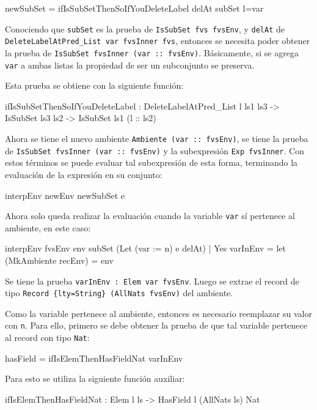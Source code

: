 \begin{code}
newSubSet =
  ifIsSubSetThenSoIfYouDeleteLabel delAt subSet {l=var}
\end{code}

Conociendo que \texttt{subSet} es la prueba de \texttt{IsSubSet fvs fvsEnv}, y \texttt{delAt} de \texttt{DeleteLabelAtPred\_List var fvsInner fvs}, entonces se necesita poder obtener la prueba de \texttt{IsSubSet fvsInner (var :: fvsEnv)}. Básicamente, si se agrega \texttt{var} a ambas listas la propiedad de ser un subconjunto se preserva.

Esta prueba se obtiene con la siguiente función:

\begin{code}
ifIsSubSetThenSoIfYouDeleteLabel :
  DeleteLabelAtPred_List l ls1 ls3 ->
  IsSubSet ls3 ls2 -> IsSubSet ls1 (l :: ls2)
\end{code}

Ahora se tiene el nuevo ambiente \texttt{Ambiente (var :: fvsEnv)}, se tiene la prueba de \texttt{IsSubSet fvsInner (var :: fvsEnv)} y la subexpresión \texttt{Exp fvsInner}. Con estos términos se puede evaluar tal subexpresión de esta forma, terminando la evaluación de la expresión en su conjunto:

\begin{code}
interpEnv newEnv newSubSet e
\end{code}

Ahora solo queda realizar la evaluación cuando la variable \texttt{var} sí pertenece al ambiente, en este caso:

\begin{code}
interpEnv {fvsEnv} env subSet (Let (var := n) e delAt)
  | Yes varInEnv =
  let (MkAmbiente recEnv) = env
\end{code}

Se tiene la prueba \texttt{varInEnv : Elem var fvsEnv}. Luego se extrae el record de tipo \texttt{Record \{lty=String\} (AllNats fvsEnv)} del ambiente.

Como la variable pertenece al ambiente, entonces es necesario reemplazar su valor con \texttt{n}. Para ello, primero se debe obtener la prueba de que tal variable pertenece al record con tipo \texttt{Nat}:

\begin{code}
hasField = ifIsElemThenHasFieldNat varInEnv
\end{code}

Para esto se utiliza la siguiente función auxiliar:

\begin{code}
ifIsElemThenHasFieldNat : Elem l ls -> HasField l (AllNats ls) Nat
\end{code}

